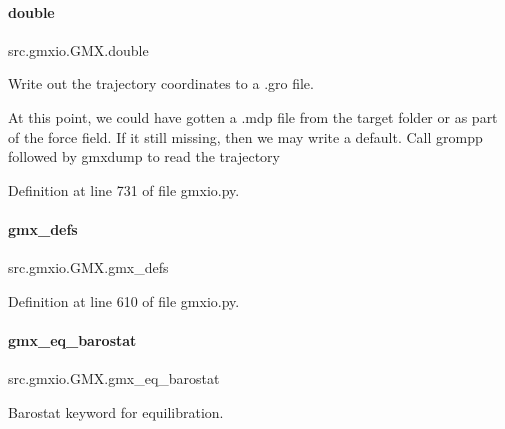 \mbox{\label{classsrc_1_1gmxio_1_1GMX_a3554ea6c9cab32e582a5ebeeb48b94da}} 
\paragraph{\texorpdfstring{double}{double}}
{\footnotesize\ttfamily src.\+gmxio.\+G\+M\+X.\+double}



Write out the trajectory coordinates to a .gro file. 

At this point, we could have gotten a .mdp file from the target folder or as part of the force field. If it still missing, then we may write a default. Call grompp followed by gmxdump to read the trajectory 

Definition at line 731 of file gmxio.\+py.

\mbox{\label{classsrc_1_1gmxio_1_1GMX_a4739a21d2bd0b02f69e4fa2c3d831849}} 
\paragraph{\texorpdfstring{gmx\+\_\+defs}{gmx\_defs}}
{\footnotesize\ttfamily src.\+gmxio.\+G\+M\+X.\+gmx\+\_\+defs}



Definition at line 610 of file gmxio.\+py.

\mbox{\label{classsrc_1_1gmxio_1_1GMX_a92135a30fa70b53aafdcb5984c3479a8}} 
\paragraph{\texorpdfstring{gmx\+\_\+eq\+\_\+barostat}{gmx\_eq\_barostat}}
{\footnotesize\ttfamily src.\+gmxio.\+G\+M\+X.\+gmx\+\_\+eq\+\_\+barostat}



Barostat keyword for equilibration. 



